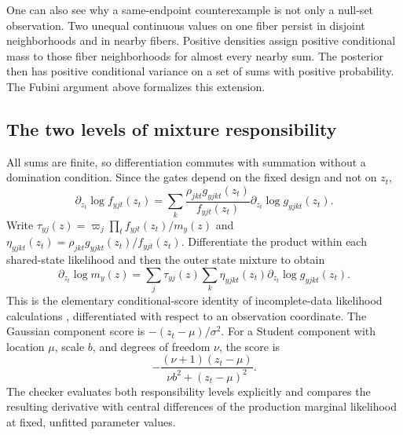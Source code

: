 One can also see why a same-endpoint counterexample is not only a null-set
observation. Two unequal continuous values on one fiber persist in disjoint
neighborhoods and in nearby fibers. Positive densities assign positive
conditional mass to those fiber neighborhoods for almost every nearby sum.
The posterior then has positive conditional variance on a set of sums with
positive probability. The Fubini argument above formalizes this extension.

\subsection{The two levels of mixture responsibility}
All sums are finite, so differentiation commutes with summation without a
domination condition. Since the gates depend on the fixed design and not on
$z_t$,
\[
 \partial_{z_t}\log f_{yjt}(z_t)
 =\sum_k\frac{\rho_{jkt}g_{yjkt}(z_t)}{f_{yjt}(z_t)}
          \partial_{z_t}\log g_{yjkt}(z_t).
\]
Write $\tau_{yj}(z)=\varpi_j\prod_t f_{yjt}(z_t)/m_y(z)$ and
$\eta_{yjkt}(z_t)=\rho_{jkt}g_{yjkt}(z_t)/f_{yjt}(z_t)$.
Differentiate the product within each shared-state likelihood and then the
outer state mixture to obtain
\begin{equation}
 \partial_{z_t}\log m_y(z)
 =\sum_j\tau_{yj}(z)\sum_k\eta_{yjkt}(z_t)
       \partial_{z_t}\log g_{yjkt}(z_t).
 \label{eq:mixture-score-responsibilities}
\end{equation}
This is the elementary conditional-score identity of incomplete-data
likelihood calculations \cite{louis1982observed}, differentiated with respect
to an observation coordinate. The Gaussian component score is
$-(z_t-\mu)/\sigma^2$. For a Student component with location $\mu$, scale $b$,
and degrees of freedom $\nu$, the score is
\[
 -\frac{(\nu+1)(z_t-\mu)}{\nu b^2+(z_t-\mu)^2}.
\]
The checker evaluates both responsibility levels explicitly and compares the
resulting derivative with central differences of the production marginal
likelihood at fixed, unfitted parameter values.

